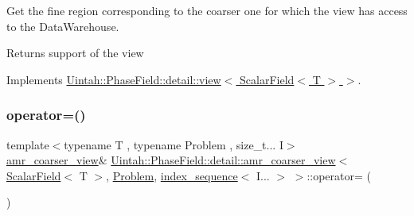Get the fine region corresponding to the coarser one for which the view has access to the Data\+Warehouse. 

\begin{DoxyReturn}{Returns}
support of the view 
\end{DoxyReturn}


Implements \hyperlink{classUintah_1_1PhaseField_1_1detail_1_1view_3_01ScalarField_3_01T_01_4_01_4_a3e14b0c7a57a57707bb33954861ab1c1}{Uintah\+::\+Phase\+Field\+::detail\+::view$<$ Scalar\+Field$<$ T $>$ $>$}.

\mbox{\label{classUintah_1_1PhaseField_1_1detail_1_1amr__coarser__view_3_01ScalarField_3_01T_01_4_00_01Proble9cadea116dab5bdb44bb3e29abbe99ef_a2e79e402bc0ccd6e06672f8f79fe4bda}} 
\subsubsection{\texorpdfstring{operator=()}{operator=()}}
{\footnotesize\ttfamily template$<$typename T , typename Problem , size\+\_\+t... I$>$ \\
\hyperlink{classUintah_1_1PhaseField_1_1detail_1_1amr__coarser__view}{amr\+\_\+coarser\+\_\+view}\& \hyperlink{classUintah_1_1PhaseField_1_1detail_1_1amr__coarser__view}{Uintah\+::\+Phase\+Field\+::detail\+::amr\+\_\+coarser\+\_\+view}$<$ \hyperlink{structUintah_1_1PhaseField_1_1ScalarField}{Scalar\+Field}$<$ T $>$, \hyperlink{classUintah_1_1PhaseField_1_1Problem}{Problem}, \hyperlink{namespaceUintah_1_1PhaseField_a237de804d99512e50613aff7c94a9461}{index\+\_\+sequence}$<$ I... $>$ $>$\+::operator= (\begin{DoxyParamCaption}\item[{const \hyperlink{classUintah_1_1PhaseField_1_1detail_1_1amr__coarser__view}{amr\+\_\+coarser\+\_\+view}$<$ \hyperlink{structUintah_1_1PhaseField_1_1ScalarField}{Scalar\+Field}$<$ T $>$, \hyperlink{classUintah_1_1PhaseField_1_1Problem}{Problem}, \hyperlink{namespaceUintah_1_1PhaseField_a237de804d99512e50613aff7c94a9461}{index\+\_\+sequence}$<$ I... $>$ $>$ \&}]{ }\end{DoxyParamCaption})\hspace{0.3cm}{\ttfamily [delete]}}



